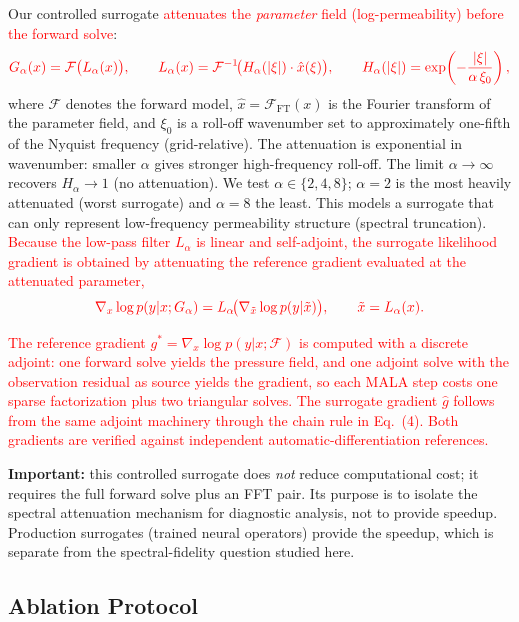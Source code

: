 \documentclass[12pt]{article}
\newcommand{\add}[1]{\textcolor{red}{#1}}
\begin{document}
Our controlled surrogate \add{attenuates the \emph{parameter} field (log-permeability) before the forward solve}:
\begin{equation}
{\color{red} G_{\alpha}(x)=\mathcal{F}\big(L_{\alpha}(x)\big),\qquad L_{\alpha}(x)=\mathcal{F}^{-1}\!\big(H_{\alpha}(|\xi|)\cdot\hat{x}(\xi)\big),\qquad H_{\alpha}(|\xi|)=\exp\!\left(-\frac{|\xi|}{\alpha\,\xi_{0}}\right),}
\end{equation}
where $\mathcal{F}$ denotes the forward model, $\hat{x}=\mathcal{F}_{\mathrm{FT}}(x)$ is the Fourier transform of the parameter field, and $\xi_{0}$ is a roll-off wavenumber set to approximately one-fifth of the Nyquist frequency (grid-relative). The attenuation is exponential in wavenumber: smaller $\alpha$ gives stronger high-frequency roll-off. The limit $\alpha\to\infty$ recovers $H_{\alpha}\to1$ (no attenuation). We test $\alpha\in\{2,4,8\}$; $\alpha=2$ is the most heavily attenuated (worst surrogate) and $\alpha=8$ the least. This models a surrogate that can only represent low-frequency permeability structure (spectral truncation). \add{Because the low-pass filter $L_{\alpha}$ is linear and self-adjoint, the surrogate likelihood gradient is obtained by attenuating the reference gradient evaluated at the attenuated parameter,}
\begin{equation}
{\color{red} \nabla_{x}\log p(y|x;G_{\alpha})=L_{\alpha}\!\big(\nabla_{\tilde x}\log p(y|\tilde x)\big),\qquad \tilde x=L_{\alpha}(x).}
\end{equation}

\add{The reference gradient $g^{*}=\nabla_x\log p(y|x;\mathcal{F})$ is computed with a discrete adjoint: one forward solve yields the pressure field, and one adjoint solve with the observation residual as source yields the gradient, so each MALA step costs one sparse factorization plus two triangular solves. The surrogate gradient $\hat g$ follows from the same adjoint machinery through the chain rule in Eq.~(4). Both gradients are verified against independent automatic-differentiation references.}

\textbf{Important:} this controlled surrogate does \emph{not} reduce computational cost; it requires the full forward solve plus an FFT pair. Its purpose is to isolate the spectral attenuation mechanism for diagnostic analysis, not to provide speedup. Production surrogates (trained neural operators) provide the speedup, which is separate from the spectral-fidelity question studied here.

\subsection{Ablation Protocol}
\end{document}
